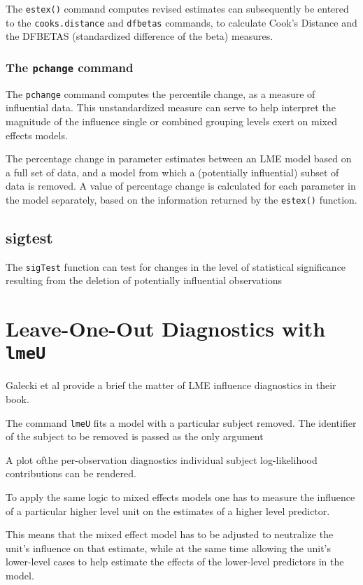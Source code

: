 \documentclass[12pt, a4paper]{article}
\begin{document}
The \texttt{estex()} command computes revised estimates can subsequently
be entered to the \texttt{cooks.distance} and \texttt{dfbetas} commands, to calculate Cook’s Distance
and the DFBETAS (standardized difference of the beta) measures.
\subsubsection*{The \texttt{pchange} command}

The \texttt{pchange} command computes the percentile change, as a measure of influential data. This unstandardized measure can
serve to help interpret the magnitude of the influence single or combined grouping levels exert on
mixed effects models. 

The percentage change in parameter estimates between an LME model based on a full set of data, and a model from which a (potentially influential)
subset of data is removed. A value of percentage change is calculated for each parameter in the
model separately, based on the information returned by the \texttt{estex()} function.

\subsection*{sigtest}

The \texttt{sigTest} function can test for changes in the level of statistical significance resulting from
the deletion of potentially influential observations


\section{Leave-One-Out Diagnostics with \texttt{lmeU}}
Galecki et al provide a brief the matter of LME influence diagnostics in their book.

The command \texttt{lmeU} fits a model with a particular subject removed. The identifier of the subject to be removed is passed as the only argument

A plot ofthe per-observation diagnostics individual subject log-likelihood contributions can be rendered.

To apply the same logic to mixed effects models one has to measure the influence of a particular higher
level unit on the estimates of a higher level predictor. 

This means that the mixed effect model has to
be adjusted to neutralize the unit’s influence on that estimate, while at the same time allowing the unit’s
lower-level cases to help estimate the effects of the lower-level predictors in the model. 
\end{document}
